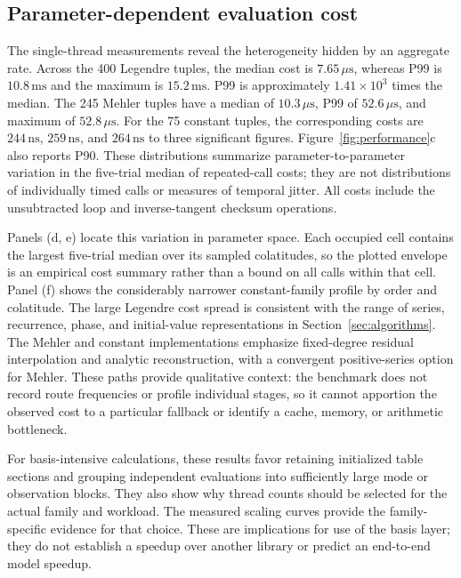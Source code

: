﻿\documentclass[11pt,a4paper]{article}
\begin{document}
\subsection{Parameter-dependent evaluation cost}

The single-thread measurements reveal the heterogeneity hidden by an aggregate rate. Across the 400 Legendre tuples, the median cost is $7.65\,\mu\mathrm{s}$, whereas P99 is $10.8\,\mathrm{ms}$ and the maximum is $15.2\,\mathrm{ms}$. P99 is approximately $1.41\times10^3$ times the median. The 245 Mehler tuples have a median of $10.3\,\mu\mathrm{s}$, P99 of $52.6\,\mu\mathrm{s}$, and maximum of $52.8\,\mu\mathrm{s}$. For the 75 constant tuples, the corresponding costs are $244\,\mathrm{ns}$, $259\,\mathrm{ns}$, and $264\,\mathrm{ns}$ to three significant figures. Figure~\ref{fig:performance}c also reports P90. These distributions summarize parameter-to-parameter variation in the five-trial median of repeated-call costs; they are not distributions of individually timed calls or measures of temporal jitter. All costs include the unsubtracted loop and inverse-tangent checksum operations.

Panels (d, e) locate this variation in parameter space. Each occupied cell contains the largest five-trial median over its sampled colatitudes, so the plotted envelope is an empirical cost summary rather than a bound on all calls within that cell. Panel (f) shows the considerably narrower constant-family profile by order and colatitude. The large Legendre cost spread is consistent with the range of series, recurrence, phase, and initial-value representations in Section~\ref{sec:algorithms}. The Mehler and constant implementations emphasize fixed-degree residual interpolation and analytic reconstruction, with a convergent positive-series option for Mehler. These paths provide qualitative context: the benchmark does not record route frequencies or profile individual stages, so it cannot apportion the observed cost to a particular fallback or identify a cache, memory, or arithmetic bottleneck.

For basis-intensive calculations, these results favor retaining initialized table sections and grouping independent evaluations into sufficiently large mode or observation blocks. They also show why thread counts should be selected for the actual family and workload. The measured scaling curves provide the family-specific evidence for that choice. These are implications for use of the basis layer; they do not establish a speedup over another library or predict an end-to-end model speedup.
\end{document}
